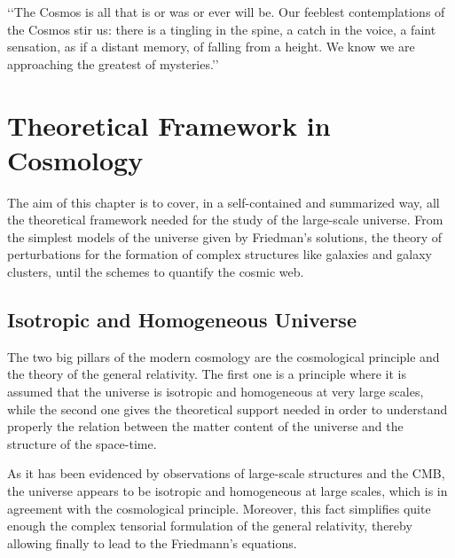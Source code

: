 \begin{savequote}[50mm]
‘‘The Cosmos is all that is or was or ever will be. Our feeblest contemplations 
of the Cosmos stir us: there is a tingling in the spine, a catch in the voice, 
a faint sensation, as if a distant memory, of falling from a height. We know 
we are approaching the greatest of mysteries.’’

\end{savequote}




\chapter{Theoretical Framework in Cosmology}
\label{cha:Theoretical Framework}


The aim of this chapter is to cover, in a self-contained and summarized 
way, all the theoretical framework needed for the study of the large-scale
universe. From the simplest models of the universe given by Friedman's 
solutions, the theory of perturbations for the formation of complex 
structures like galaxies and galaxy clusters, until the schemes to 
quantify the cosmic web.







\section{Isotropic and Homogeneous Universe}
\label{sec:IsotropicAndHomogeneousUniverse}


The two big pillars of the modern cosmology are the cosmological principle
and the theory of the general relativity. The first one is a principle 
where it is assumed that the universe is isotropic and homogeneous at very
large scales, while the second one gives the theoretical support needed in 
order to understand properly the relation between the matter content of 
the universe and the structure of the space-time.


As it has been evidenced by observations of large-scale structures and the 
CMB, the universe appears to be isotropic and homogeneous at large scales,
which is in agreement with the cosmological principle. Moreover, this fact
simplifies quite enough the complex tensorial formulation of the general
relativity, thereby allowing finally to lead to the Friedmann's equations.



